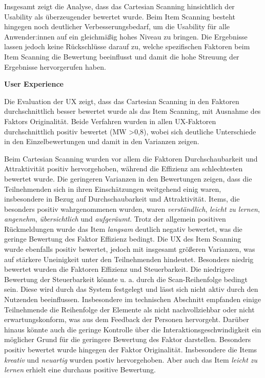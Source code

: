 Insgesamt zeigt die Analyse, dass das Cartesian Scanning hinsichtlich der Usability als überzeugender bewertet wurde. Beim Item Scanning besteht hingegen noch deutlicher Verbesserungsbedarf, um die Usability für alle Anwender:innen auf ein gleichmäßig hohes Niveau zu bringen. Die Ergebnisse lassen jedoch keine Rückschlüsse darauf zu, welche spezifischen Faktoren beim Item Scanning die Bewertung beeinflusst und damit die hohe Streuung der Ergebnisse hervorgerufen haben. 

\textbf{User Experience}

Die Evaluation der UX zeigt, dass das Cartesian Scanning in den Faktoren durchschnittlich besser bewertet wurde als das Item Scanning, mit Ausnahme des Faktors Originalität. Beide Verfahren wurden in allen UX-Faktoren durchschnittlich positiv bewertet (MW >0,8), wobei sich deutliche Unterschiede in den Einzelbewertungen und damit in den Varianzen zeigen.

Beim Cartesian Scanning wurden vor allem die Faktoren Durchschaubarkeit und Attraktivität positiv hervorgehoben, während die Effizienz am schlechtesten bewertet wurde. Die geringeren Varianzen in den Bewertungen zeigen, dass die Teilnehmenden sich in ihren Einschätzungen weitgehend einig waren, insbesondere in Bezug auf Durchschaubarkeit und Attraktivität. Items, die besonders positiv wahrgenommenen wurden, waren \textit{verständlich}, \textit{leicht zu lernen}, \textit{angenehm}, \textit{übersichtlich} und \textit{aufgeräumt}. Trotz der allgemein positiven Rückmeldungen wurde das Item \textit{langsam} deutlich negativ bewertet, was die geringe Bewertung des Faktor Effizienz bedingt.\newline
Die UX des Item Scanning wurde ebenfalls positiv bewertet, jedoch mit insgesamt größeren Varianzen, was auf stärkere Uneinigkeit unter den Teilnehmenden hindeutet. Besonders niedrig bewertet wurden die Faktoren Effizienz und Steuerbarkeit. Die niedrigere Bewertung der Steuerbarkeit könnte u. a. durch die Scan-Reihenfolge bedingt sein. Diese wird durch das System festgelegt und lässt sich nicht aktiv durch den Nutzenden beeinflussen. Insbesondere im technischen Abschnitt empfanden einige Teilnehmende die Reihenfolge der Elemente als nicht nachvollziehbar oder nicht erwartungskonform, was aus dem Feedback der Personen hervorgeht. Darüber hinaus könnte auch die geringe Kontrolle über die Interaktionsgeschwindigkeit ein möglicher Grund für die geringere Bewertung des Faktor darstellen. 
Besonders positiv bewertet wurde hingegen der Faktor Originalität. Insbesondere die Items \textit{kreativ} und \textit{neuartig} wurden postiv hervorgehoben. Aber auch das Item \textit{leicht zu lernen} erhielt eine durchaus positive Bewertung. 

